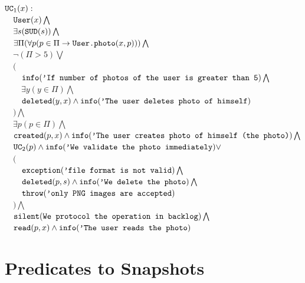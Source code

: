 \documentclass[12pt,oneside,letterpaper]{article}
\begin{document}
        \begin{maths}
        $\mbox{\texttt{UC}}_1(x) : $ \\
        $\quad \mbox{\texttt{User}}(x) \bigwedge$ \\
        $\quad \exists s (\mbox{\texttt{SUD}}(s)) \bigwedge$ \\
        $\quad \exists \Pi(\forall p (p \in \Pi \to \mbox{\texttt{User.photo}}(x, p))) \bigwedge$ \\
        $\quad \neg (\Pi > 5) \bigvee $ \\
        $\quad ($ \\
        $\quad\quad \mbox{\texttt{info}}(\mbox{\texttt{'If number of photos of the user is greater than 5}})\bigwedge$ \\
        $\quad\quad \exists y(y \in \Pi) \bigwedge$ \\
        $\quad\quad \mbox{\texttt{deleted}}(y, x) \wedge \mbox{\texttt{info}}(\mbox{\texttt{'The user deletes photo of himself}})$ \\
        $\quad ) \bigwedge$ \\
        $\quad \exists p(p \in \Pi) \bigwedge$ \\
        $\quad \mbox{\texttt{created}}(p, x) \wedge \mbox{\texttt{info}}(\mbox{\texttt{'The user creates photo of himself (the photo)}})\bigwedge$ \\
        $\quad \mbox{\texttt{UC}}_2(p) \wedge \mbox{\texttt{info}}(\mbox{\texttt{'We validate the photo immediately}}) \vee$ \\
        $\quad ($ \\
        $\quad\quad \mbox{\texttt{exception}}(\mbox{\texttt{'file format is not valid}}) \bigwedge$ \\
        $\quad\quad \mbox{\texttt{deleted}}(p, s) \wedge \mbox{\texttt{info}}(\mbox{\texttt{'We delete the photo}})\bigwedge$ \\
        $\quad\quad \mbox{\texttt{throw}}(\mbox{\texttt{'only PNG images are accepted}})$ \\
        $\quad ) \bigwedge$ \\
        $\quad \mbox{\texttt{silent}}(\mbox{\texttt{We protocol the operation in backlog}})\bigwedge$ \\
        $\quad \mbox{\texttt{read}}(p, x)\wedge \mbox{\texttt{info}}(\mbox{\texttt{'The user reads the photo}})$ \\
        \end{maths}





\section{Predicates to Snapshots}
\label{sec:to-data}
\end{document}
